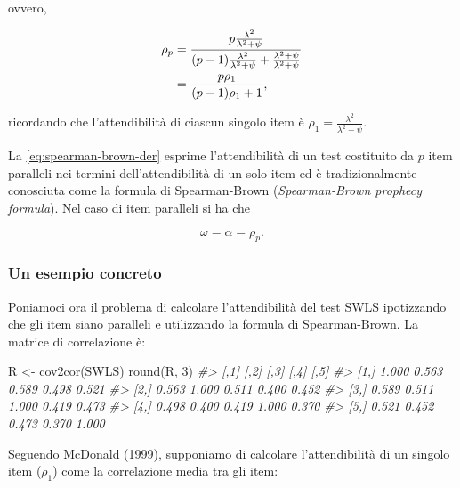 \documentclass[
  11pt,
]{krantz}
\makeatletter
\newenvironment{Shaded}{\begin{snugshade}}{\end{snugshade}}
\newcommand{\CommentTok}[1]{\textcolor[rgb]{0.37,0.37,0.37}{\textit{#1}}}
\newcommand{\DecValTok}[1]{\textcolor[rgb]{0.06,0.06,0.06}{#1}}
\newcommand{\FunctionTok}[1]{\textcolor[rgb]{0,0,0}{#1}}
\newcommand{\NormalTok}[1]{#1}
\newcommand{\OtherTok}[1]{\textcolor[rgb]{0.37,0.37,0.37}{#1}}
\newenvironment{kframe}{%
\medskip{}
\setlength{\fboxsep}{.8em}
 \def\at@end@of@kframe{}%
 \ifinner\ifhmode%
  \def\at@end@of@kframe{\end{minipage}}%
  \begin{minipage}{\columnwidth}%
 \fi\fi%
 \def\FrameCommand##1{\hskip\@totalleftmargin \hskip-\fboxsep
 \colorbox{shadecolor}{##1}\hskip-\fboxsep
     \hskip-\linewidth \hskip-\@totalleftmargin \hskip\columnwidth}%
 \MakeFramed {\advance\hsize-\width
   \@totalleftmargin\z@ \linewidth\hsize
   \@setminipage}}%
 {\par\unskip\endMakeFramed%
 \at@end@of@kframe}
\renewenvironment{Shaded}{\begin{kframe}}{\end{kframe}}
\theoremstyle{definition}
\theoremstyle{definition}
\theoremstyle{definition}
\theoremstyle{definition}
\theoremstyle{remark}
\makeatother
\begin{document}
ovvero,

\begin{equation}
\begin{aligned}
  \rho_p &= \frac{p \frac{\lambda^2}{\lambda^2+\psi}}{(p-1) \frac{\lambda^2}{\lambda^2+\psi} + \frac{\lambda^2 + \psi}{\lambda^2+\psi}} \notag\\
  &= \frac{p \rho_1}{(p-1)\rho_1 + 1},
\end{aligned}
\label{eq:spearman-brown-der}
\end{equation}

ricordando che l'attendibilità di ciascun singolo item è \(\rho_1 = \frac{\lambda^2}{\lambda^2 + \psi}\).

La \eqref{eq:spearman-brown-der} esprime l'attendibilità di un test costituito da \(p\) item paralleli nei termini dell'attendibilità di un solo item ed è tradizionalmente conosciuta come la formula di Spearman-Brown (\emph{Spearman-Brown prophecy formula}). Nel caso di item paralleli si ha che

\[
\omega=\alpha=\rho_p.
\]

\hypertarget{un-esempio-concreto-2}{%
\subsubsection{Un esempio concreto}\label{un-esempio-concreto-2}}

Poniamoci ora il problema di calcolare l'attendibilità del test SWLS ipotizzando che gli item siano paralleli e utilizzando la formula di Spearman-Brown. La matrice di correlazione è:

\begin{Shaded}
\begin{Highlighting}[]
\NormalTok{R }\OtherTok{\textless{}{-}} \FunctionTok{cov2cor}\NormalTok{(SWLS)}
\FunctionTok{round}\NormalTok{(R, }\DecValTok{3}\NormalTok{)}
\CommentTok{\#\textgreater{}       [,1]  [,2]  [,3]  [,4]  [,5]}
\CommentTok{\#\textgreater{} [1,] 1.000 0.563 0.589 0.498 0.521}
\CommentTok{\#\textgreater{} [2,] 0.563 1.000 0.511 0.400 0.452}
\CommentTok{\#\textgreater{} [3,] 0.589 0.511 1.000 0.419 0.473}
\CommentTok{\#\textgreater{} [4,] 0.498 0.400 0.419 1.000 0.370}
\CommentTok{\#\textgreater{} [5,] 0.521 0.452 0.473 0.370 1.000}
\end{Highlighting}
\end{Shaded}

Seguendo McDonald (1999), supponiamo di calcolare l'attendibilità di un singolo item (\(\rho_1\)) come la correlazione media tra gli item:
\end{document}
